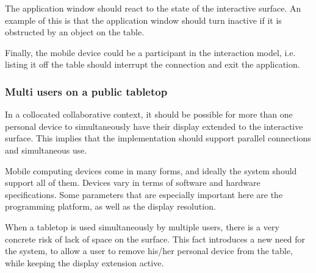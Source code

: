 The application window should react to the state of the interactive surface.
An example of this is that the application window should turn inactive if it is obstructed by an object on the table.

Finally, the mobile device could be a participant in the interaction model, i.e. listing it off the table should interrupt the connection and exit the application.


\subsubsection{Multi users on a public tabletop}

In a collocated collaborative context, it should be possible for more than one personal device to simultaneously have their display extended to the interactive surface.
This implies that the implementation should support parallel connections and simultaneous use.

Mobile computing devices come in many forms, and ideally the system should support all of them.
Devices vary in terms of software and hardware specifications.
Some parameters that are especially important here are the programming platform, as well as the display resolution.

When a tabletop is used simultaneously by multiple users, there is a very concrete risk of lack of space on the surface.
This fact introduces a new need for the system, to allow a user to remove his/her personal device from the table, while keeping the display extension active.

